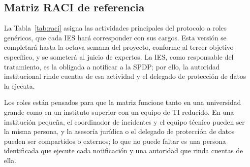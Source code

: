 \subsection{Matriz RACI de referencia}
La Tabla~\ref{tab:raci} asigna las actividades principales del protocolo a roles genéricos, que cada IES hará corresponder con sus cargos. Esta versión se completará hasta la octava semana del proyecto, conforme al tercer objetivo específico, y se someterá al juicio de expertos. La IES, como responsable del tratamiento, es la obligada a notificar a la SPDP; por ello, la autoridad institucional rinde cuentas de esa actividad y el delegado de protección de datos la ejecuta.

Los roles están pensados para que la matriz funcione tanto en una universidad grande como en un instituto superior con un equipo de TI reducido. En una institución pequeña, el coordinador de incidentes y el equipo técnico pueden ser la misma persona, y la asesoría jurídica o el delegado de protección de datos pueden ser compartidos o externos; lo que no puede faltar es una persona identificada que ejecute cada notificación y una autoridad que rinda cuentas de ella.


